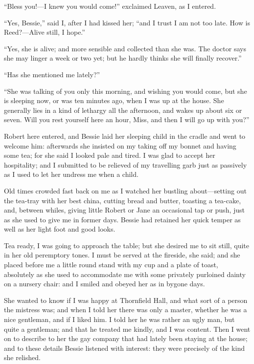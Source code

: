 \enquote{Bless you!---I knew you would come!} exclaimed \Mrs{} Leaven, as
I entered.

\enquote{Yes, Bessie,} said I, after I had kissed her; \enquote{and I
	trust I am not too late. How is \Mrs{} Reed?---Alive still, I hope.}

\enquote{Yes, she is alive; and more sensible and collected than she
	was. The doctor says she may linger a week or two yet; but he hardly
	thinks she will finally recover.}

\enquote{Has she mentioned me lately?}

\enquote{She was talking of you only this morning, and wishing you would
	come, but she is sleeping now, or was ten minutes ago, when I was up at
	the house. She generally lies in a kind of lethargy all the afternoon,
	and wakes up about six or seven. Will you rest yourself here an hour,
	Miss, and then I will go up with you?}

Robert here entered, and Bessie laid her sleeping child in the cradle
and went to welcome him: afterwards she insisted on my taking off my
bonnet and having some tea; for she said I looked pale and tired. I was
glad to accept her hospitality; and I submitted to be relieved of my
travelling garb just as passively as I used to let her undress me when a
child.

Old times crowded fast back on me as I watched her bustling
about---setting out the tea-tray with her best china, cutting bread and
butter, toasting a tea-cake, and, between whiles, giving little Robert
or Jane an occasional tap or push, just as she used to give me in former
days. Bessie had retained her quick temper as well as her light foot
and good looks.

Tea ready, I was going to approach the table; but she desired me to sit
still, quite in her old peremptory tones. I must be served at the
fireside, she said; and she placed before me a little round stand with
my cup and a plate of toast, absolutely as she used to accommodate me
with some privately purloined dainty on a nursery chair: and I smiled
and obeyed her as in bygone days.

She wanted to know if I was happy at Thornfield Hall, and what sort of a
person the mistress was; and when I told her there was only a master,
whether he was a nice gentleman, and if I liked him. I told her he was
rather an ugly man, but quite a gentleman; and that he treated me
kindly, and I was content. Then I went on to describe to her the gay
company that had lately been staying at the house; and to these details
Bessie listened with interest: they were precisely of the kind she
relished.

